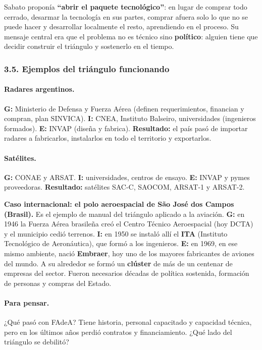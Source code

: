 Sabato proponía \textbf{``abrir el paquete tecnológico''}: en lugar de comprar todo cerrado,
desarmar la tecnología en sus partes, comprar afuera solo lo que no se puede hacer y
desarrollar localmente el resto, aprendiendo en el proceso. Su mensaje central era que el
problema no es técnico sino \textbf{político}: alguien tiene que decidir construir el
triángulo y sostenerlo en el tiempo.

\subsubsection*{3.5. Ejemplos del triángulo funcionando}

\paragraph*{Radares argentinos.}
\textbf{G:} Ministerio de Defensa y Fuerza Aérea (definen requerimientos, financian y compran,
plan SINVICA). \textbf{I:} CNEA, Instituto Balseiro, universidades (ingenieros formados).
\textbf{E:} INVAP (diseña y fabrica). \textbf{Resultado:} el país pasó de importar radares a
fabricarlos, instalarlos en todo el territorio y exportarlos.

\paragraph*{Satélites.}
\textbf{G:} CONAE y ARSAT. \textbf{I:} universidades, centros de ensayo. \textbf{E:} INVAP y
pymes proveedoras. \textbf{Resultado:} satélites SAC-C, SAOCOM, ARSAT-1 y ARSAT-2.

\begin{recuadro}
\textbf{Caso internacional: el polo aeroespacial de São José dos Campos (Brasil).}
Es el ejemplo de manual del triángulo aplicado a la aviación. \textbf{G:} en 1946 la Fuerza
Aérea brasileña creó el Centro Técnico Aeroespacial (hoy DCTA) y el municipio cedió terrenos.
\textbf{I:} en 1950 se instaló allí el \textbf{ITA} (Instituto Tecnológico de Aeronáutica),
que formó a los ingenieros. \textbf{E:} en 1969, en ese mismo ambiente, nació
\textbf{Embraer}, hoy uno de los mayores fabricantes de aviones del mundo. A su alrededor se
formó un \textbf{clúster} de más de un centenar de empresas del sector. Fueron necesarios
décadas de política sostenida, formación de personas y compras del Estado.
\end{recuadro}

\paragraph*{Para pensar.} ¿Qué pasó con FAdeA? Tiene historia, personal capacitado y
capacidad técnica, pero en los últimos años perdió contratos y financiamiento. ¿Qué lado del
triángulo se debilitó?

